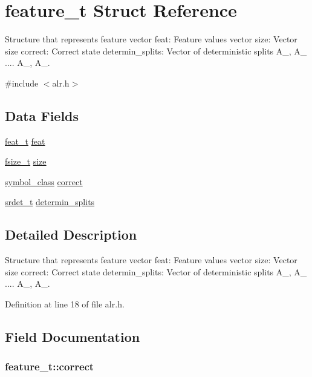 \hypertarget{structfeature__t}{\section{feature\-\_\-t Struct Reference}
\label{structfeature__t}
}


Structure that represents feature vector feat\-: Feature values vector size\-: Vector size correct\-: Correct state determin\-\_\-splits\-: Vector of deterministic splits A\-\_, A\-\_ .... A\-\_, A\-\_.  




{\ttfamily \#include $<$alr.\-h$>$}

\subsection*{Data Fields}
\begin{DoxyCompactItemize}
\item 
\hyperlink{types_8h_a9052d9742e283c5c2169b5b06f8245f0}{feat\-\_\-t} \hyperlink{structfeature__t_ad6b70165369321932d2ea796e196fee9}{feat}
\item 
\hyperlink{types_8h_a594c3568b9a4bfb59d5d849a52dd9fe0}{fsize\-\_\-t} \hyperlink{structfeature__t_a8bcf9f7c29278bfa6ffe132c07cbce18}{size}
\item 
\hyperlink{types_8h_ac2a93159315d50befc9dd047d7de19a3}{symbol\-\_\-class} \hyperlink{structfeature__t_ab9209fd7eec519e328b7016689eea85b}{correct}
\item 
\hyperlink{types_8h_a01fd33ed68eec284947315f5fc600a0a}{srdet\-\_\-t} \hyperlink{structfeature__t_aff04af2168f1be430f16d6af4ddfa63b}{determin\-\_\-splits}
\end{DoxyCompactItemize}


\subsection{Detailed Description}
Structure that represents feature vector feat\-: Feature values vector size\-: Vector size correct\-: Correct state determin\-\_\-splits\-: Vector of deterministic splits A\-\_, A\-\_ .... A\-\_, A\-\_. 

Definition at line 18 of file alr.\-h.



\subsection{Field Documentation}
\hypertarget{structfeature__t_ab9209fd7eec519e328b7016689eea85b}{
\subsubsection[{correct}]{ feature\-\_\-t\-::correct}}\label{structfeature__t_ab9209fd7eec519e328b7016689eea85b}



